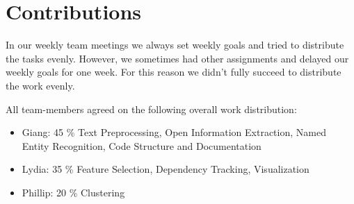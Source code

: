 \section{Contributions}
In our weekly team meetings we always set weekly goals and tried to distribute the tasks evenly. However, we sometimes had other assignments and delayed our weekly goals for one week. For this reason we didn't fully succeed to distribute the work evenly.

All team-members agreed on the following overall work distribution:
\begin{itemize}
\item Giang: 45 \% Text Preprocessing, Open Information Extraction, Named Entity Recognition, Code Structure and Documentation
\item Lydia: 35 \% Feature Selection, Dependency Tracking, Visualization
\item Phillip: 20 \% Clustering
\end{itemize}